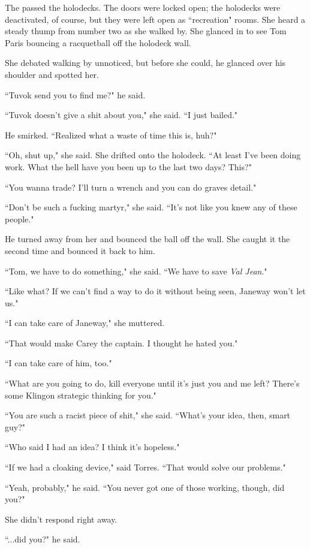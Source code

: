 \documentclass[twoside,letterpaper,12pt]{memoir}
\begin{document}
The passed the holodecks. The doors were locked open; the holodecks were deactivated, of course, but they were left open as ``recreation" rooms. She heard a steady thump from number two as she walked by. She glanced in to see Tom Paris bouncing a racquetball off the holodeck wall. 

She debated walking by unnoticed, but before she could, he glanced over his shoulder and spotted her. 

``Tuvok send you to find me?" he said. 

``Tuvok doesn't give a shit about you," she said. ``I just bailed." 

He smirked. ``Realized what a waste of time this is, huh?" 

``Oh, shut up," she said. She drifted onto the holodeck. ``At least I've been doing work. What the hell have you been up to the last two days? This?" 

``You wanna trade? I'll turn a wrench and you can do graves detail." 

``Don't be such a fucking martyr," she said. ``It's not like you knew any of these people." 

He turned away from her and bounced the ball off the wall. She caught it the second time and bounced it back to him. 

``Tom, we have to do something," she said. ``We have to save \textit{Val Jean}." 

``Like what? If we can't find a way to do it without being seen, Janeway won't let us." 

``I can take care of Janeway," she muttered. 

``That would make Carey the captain. I thought he hated you." 

``I can take care of him, too." 

``What are you going to do, kill everyone until it's just you and me left? There's some Klingon strategic thinking for you." 

``You are such a racist piece of shit," she said. ``What's your idea, then, smart guy?" 

``Who said I had an idea? I think it's hopeless." 

``If we had a cloaking device," said Torres. ``That would solve our problems." 

``Yeah, probably," he said. ``You never got one of those working, though, did you?" 

She didn't respond right away. 

``...did you?" he said. 
\end{document}
